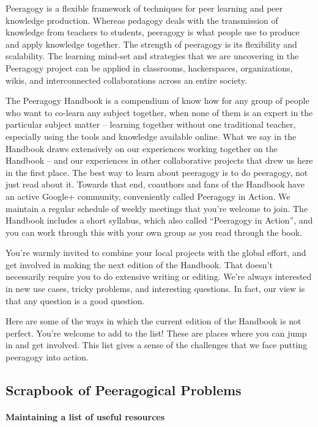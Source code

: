 Peeragogy is a flexible framework of techniques for peer learning and
peer knowledge production. Whereas pedagogy deals with the transmission
of knowledge from teachers to students, peeragogy is what people use to
produce and apply knowledge together. The strength of peeragogy is its
flexibility and scalability. The learning mind-set and strategies that
we are uncovering in the Peeragogy project can be applied in classrooms,
hackerspaces, organizations, wikis, and interconnected collaborations
across an entire society.

The Peeragogy Handbook is a compendium of know how for any group of
people who want to co-learn any subject together, when none of them is
an expert in the particular subject matter -- learning together without
one traditional teacher, especially using the tools and knowledge
available online. What we say in the Handbook draws extensively on our
experiences working together on the Handbook -- and our experiences in
other collaborative projects that drew us here in the first place. The
best way to learn about peeragogy is to do peeragogy, not just read
about it. Towards that end, coauthors and fans of the Handbook have an
active Google+ community, conveniently called Peeragogy in Action. We
maintain a regular schedule of weekly meetings that you're welcome to
join. The Handbook includes a short syllabus, which also called
``Peeragogy in Action'', and you can work through this with your own
group as you read through the book.

You're warmly invited to combine your local projects with the global
effort, and get involved in making the next edition of the Handbook.
That doesn't necessarily require you to do extensive writing or editing.
We're always interested in new use cases, tricky problems, and
interesting questions. In fact, our view is that any question is a good
question.

Here are some of the ways in which the current edition of the Handbook
is not perfect. You're welcome to add to the list! These are places
where you can jump in and get involved. This list gives a sense of the
challenges that we face putting peeragogy into action.

\hypertarget{scrapbook-of-peeragogical-problems}{%
\subsection{Scrapbook of Peeragogical
Problems}\label{scrapbook-of-peeragogical-problems}}

\hypertarget{maintaining-a-list-of-useful-resources}{%
\paragraph{Maintaining a list of useful
resources}\label{maintaining-a-list-of-useful-resources}}

